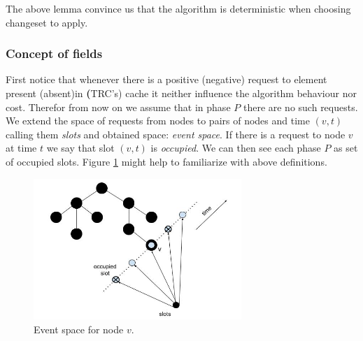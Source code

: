 The above lemma convince us that the algorithm is deterministic when choosing 
changeset to apply.

\subsubsection{Concept of fields}
First notice that whenever there is a positive (negative) request to element 
present (absent)in \textbf(TRC's) cache it neither influence the algorithm 
behaviour nor cost. Therefor from now on we assume that in phase $P$ there are 
no such requests.
We extend the space of requests from nodes to pairs of nodes and time $(v, t)$ 
calling them \textit{slots} and obtained space: \textit{event space}. If there 
is a request to node $v$ at time $t$ we say that slot $(v, t)$ is 
\textit{occupied}. We can then see each phase $P$ as set of occupied slots. 
Figure \ref{fig:spacial_temporal} might help to familiarize with above 
definitions.
\begin{figure}
 \begin{center}
  \includegraphics[width=0.7\textwidth]{spacial_temporal.jpg}
 \end{center}
 \caption{Event space for node $v$.}
 \label{fig:spacial_temporal}
\end{figure}

